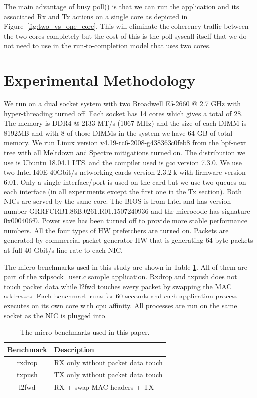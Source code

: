 \documentclass[9pt,numbers,reprint]{sigplanconf}
\begin{document}
The main advantage of busy poll() is that we can run the application
and its associated Rx and Tx actions on a single core as depicted in
Figure~\ref{fig:two_vs_one_core}. This will eliminate the coherency
traffic between the two cores completely but the cost of this is the
poll syscall itself that we do not need to use in the
run-to-completion model that uses two cores.


\section{Experimental Methodology}
\label{sec:exp:meth}

We run on a dual socket system with two Broadwell E5-2660 @ 2.7 GHz
with hyper-threading turned off. Each socket has 14 cores which gives a
total of 28. The memory is DDR4 @ 2133 MT/s (1067 MHz) and the size of
each DIMM is 8192MB and with 8 of those DIMMs in the system we have 64
GB of total memory. We run Linux version v4.19-rc6-2008-g438363c0feb8
from the bpf-next tree with all Meltdown and Spectre mitigations
turned on. The distribution we use is Ubuntu 18.04.1 LTS, and the
compiler used is gcc version 7.3.0. We use two Intel I40E 40Gbit/s
networking cards version 2.3.2-k with firmware version 6.01. Only a
single interface/port is used on the card but we use two queues on
each interface (in all experiments except the first one in the Tx
section). Both NICs are served by the same core. The BIOS is from
Intel and has version number GRRFCRB1.86B.0261.R01.1507240936 and the
microcode has signature 0x000406f0. Power save has been turned off to
provide more stable performance numbers. All the four types of HW
prefetchers are turned on. Packets are generated by commercial packet
generator HW that is generating 64-byte packets at full 40 Gbit/s line
rate to each NIC.

The micro-benchmarks used in this study are shown in Table
\ref{table:benchmarks}. All of them are part of the xdpsock\_user.c
sample application. Rxdrop and txpush does not touch packet data
while l2fwd touches every packet by swapping the MAC addresses. Each
benchmark runs for 60 seconds and each application process executes on
its own core with cpu affinity. All processes are run on the same
socket as the NIC is plugged into.

\begin{table}[ht]
\centering
\begin{tabular}{|c|p{5.5cm}|} \hline
\textbf{Benchmark} & \textbf{Description} \\ \hline
rxdrop & RX only without packet data touch\\ \hline
txpush & TX only without packet data touch\\ \hline
l2fwd & RX + swap MAC headers + TX\\ \hline
\end{tabular}
\caption{The micro-benchmarks used in this paper.}
\label{table:benchmarks}
\end{table}
\end{document}
